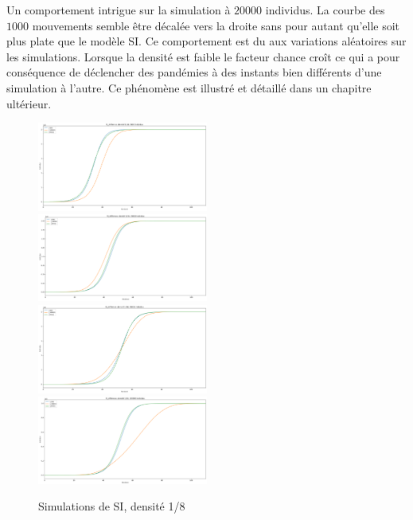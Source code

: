 Un comportement intrigue sur la simulation à $20000$ individus. La courbe des $1000$ mouvements semble être décalée vers la droite sans pour autant qu'elle soit plus plate que le modèle SI. Ce comportement est du aux variations aléatoires sur les simulations. Lorsque la densité est faible le facteur chance croît ce qui a pour conséquence de déclencher des pandémies à des instants bien différents d'une simulation à l'autre. Ce phénomène est illustré et détaillé dans un chapitre ultérieur.

\newpage

\begin{figure}
    \centering
    \captionsetup{justification=centering}
    \includegraphics[width=0.5\textwidth]{Images/SI_ref_16_5k.png}
    \includegraphics[width=0.5\textwidth]{Images/SI_ref_16_20k.png}
    \includegraphics[width=0.5\textwidth]{Images/SI_ref_16_50k.png}
    \includegraphics[width=0.5\textwidth]{Images/SI_ref_16_100k.png}
    \caption{Simulations de SI, densité 1/8}
\end{figure}

